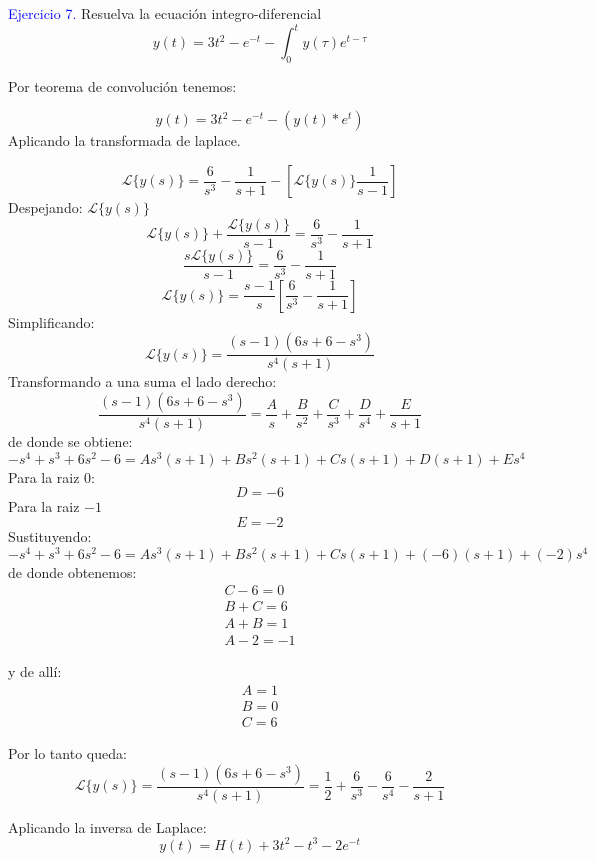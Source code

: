 \textcolor{blue}{Ejercicio 7.}
Resuelva la ecuación integro-diferencial
$$y(t)=3t^2-e^{-t}-\int_0^ty(\tau)e^{t-\tau}$$

Por teorema de convolución tenemos:

$$y(t)=3t^2-e^{-t}-(y(t)*e^t)$$
Aplicando la transformada de laplace.

$$\mathscr{L}\{y(s)\}=\frac{6}{s^3}-\frac{1}{s+1}-\left[\mathscr{L}\{y(s)\} \frac{1}{s-1} \right]$$
Despejando: $\mathscr{L}\{y(s)\}$
$$\mathscr{L}\{y(s)\}+\frac{\mathscr{L}\{y(s)\}}{s-1}=\frac{6}{s^3}-\frac{1}{s+1}$$
$$\frac{s\mathscr{L}\{y(s)\}}{s-1}=\frac{6}{s^3}-\frac{1}{s+1}$$
$$\mathscr{L}\{y(s)\}=\frac{s-1}{s}\left[ \frac{6}{s^3}-\frac{1}{s+1} \right]$$
Simplificando:
$$\mathscr{L}\{y(s)\}=\frac{\left(s-1\right)\left(6s+6-s^3\right)}{s^4\left(s+1\right)}$$
Transformando a una suma el lado derecho:
$$\frac{\left(s-1\right)\left(6s+6-s^3\right)}{s^4\left(s+1\right)}=\frac{A}{s}+\frac{B}{s^2}+\frac{C}{s^3}+\frac{D}{s^4}+\frac{E}{s+1}$$
de donde se obtiene:
$$-s^4+s^3+6s^2-6=As^3(s+1)+Bs^2(s+1)+Cs(s+1)+D(s+1)+Es^4$$
Para la raiz $0$:
$$D=-6$$
Para la raiz $-1$
$$E=-2$$
Sustituyendo:
$$-s^4+s^3+6s^2-6=As^3(s+1)+Bs^2(s+1)+Cs(s+1)+(-6)(s+1)+(-2)s^4$$
de donde obtenemos:
\begin{eqnarray*}C-6=0\\ B+C=6\\ A+B=1\\ A-2=-1 \end{eqnarray*}

y de allí:
\begin{eqnarray*} A=1\\ B=0\\ C=6 \end{eqnarray*}

Por lo tanto queda:
$$\mathscr{L}\{y(s)\}=\frac{\left(s-1\right)\left(6s+6-s^3\right)}{s^4\left(s+1\right)}=\frac{1}{2}+\frac{6}{s^3}-\frac{6}{s^4}-\frac{2}{s+1}$$

Aplicando la inversa de Laplace:
$$y(t)=H(t)+3t^2-t^3-2e^{-t}$$
